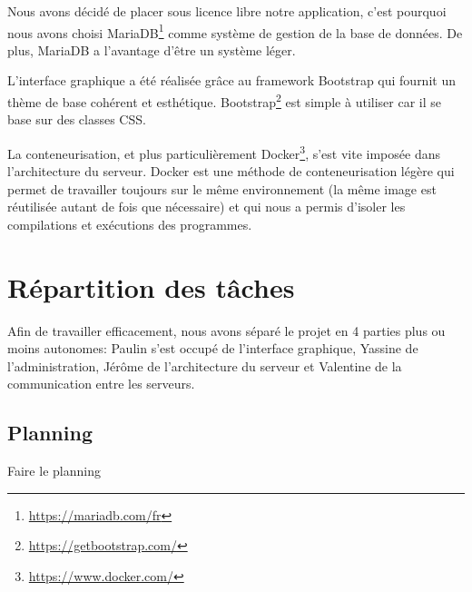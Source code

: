 \par Nous avons décidé de placer sous licence libre notre application, c'est pourquoi nous avons choisi MariaDB\footnote{\url{https://mariadb.com/fr}} comme système de gestion de la base de données. De plus, MariaDB a l'avantage d'être un système léger. \\

\par L'interface graphique a été réalisée grâce au framework Bootstrap qui fournit un thème de base cohérent et esthétique. Bootstrap\footnote{\url{https://getbootstrap.com/}} est simple à utiliser car il se base sur des classes CSS. \\

\par La conteneurisation, et plus particulièrement Docker\footnote{\url{https://www.docker.com/}}, s'est vite imposée dans l'architecture du serveur. Docker est une méthode de conteneurisation légère qui permet de travailler toujours sur le même environnement (la même image est réutilisée autant de fois que nécessaire) et qui nous a permis d'isoler les compilations et exécutions des programmes.

\section{Répartition des tâches}

\par Afin de travailler efficacement, nous avons séparé le projet en 4 parties plus ou moins autonomes: Paulin s'est occupé de l'interface graphique, Yassine de l'administration, Jérôme de l'architecture du serveur et Valentine de la communication entre les serveurs.

\subsection{Planning}

Faire le planning
